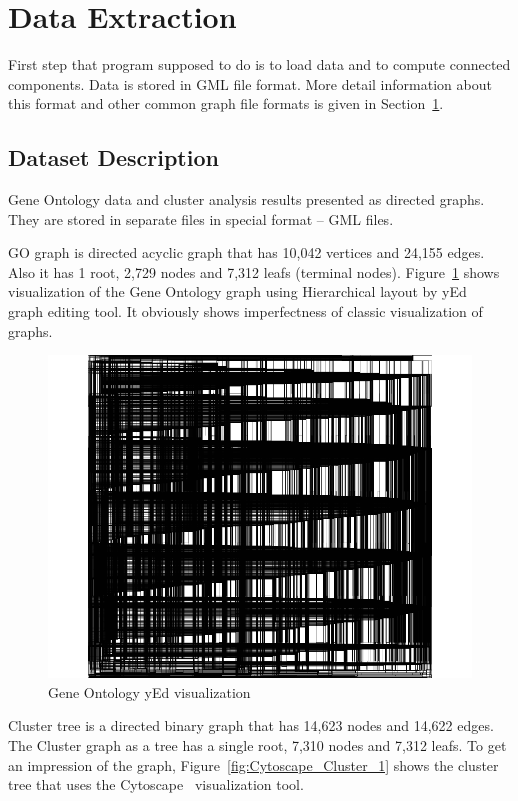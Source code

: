 \section{Data Extraction}
\label{sec:algorithm}
First step that program supposed to do is to load data and to compute connected components. Data is stored in GML file format. More detail information about this format and other common graph file formats is given in Section~\ref{sec:algorithm}.

\subsection{Dataset Description}
\label{sec:dataset_description}
Gene Ontology data and cluster analysis results presented as directed graphs. They are stored in separate files in special format -- GML files.


GO graph is directed acyclic graph that has 10,042 vertices and  24,155 edges. Also it has 1 root, 2,729 nodes and 7,312 leafs (terminal nodes).
Figure~\ref{fig:yed_GO_vis} shows visualization of the Gene Ontology graph using Hierarchical layout by yEd~\cite{yed} graph editing tool. It obviously shows imperfectness of classic visualization of graphs.


\begin{figure}[h!]
\centering
\includegraphics[scale=0.3]{pictures/yEd_GO.png}
\caption{Gene Ontology yEd visualization}
\label{fig:yed_GO_vis}
\end{figure}


Cluster tree is a directed binary graph that has 14,623 nodes and 14,622 edges. The Cluster graph as a tree has a single root, 7,310 nodes and 7,312 leafs.
To get an impression of the graph, Figure~\ref{fig:Cytoscape_Cluster_1} shows the cluster tree that uses the Cytoscape~\cite{Cytoscape} visualization tool.

